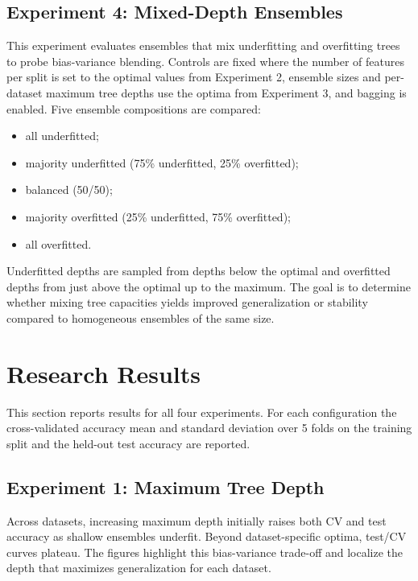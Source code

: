 \documentclass[conference]{IEEEtran}
\begin{document}
\subsection{Experiment 4: Mixed-Depth Ensembles}
This experiment evaluates ensembles that mix underfitting and overfitting trees to probe bias-variance blending. Controls are fixed where the number of features per split is set to the optimal values from Experiment 2, ensemble sizes and per-dataset maximum tree depths use the optima from Experiment 3, and bagging is enabled. 
Five ensemble compositions are compared:
\begin{itemize}
  \item all underfitted;
  \item majority underfitted (75\% underfitted, 25\% overfitted);
  \item balanced (50/50);
  \item majority overfitted (25\% underfitted, 75\% overfitted);
  \item all overfitted. 
\end{itemize}
Underfitted depths are sampled from depths below the optimal and overfitted depths from just above the optimal up to the maximum. The goal is to determine whether mixing tree capacities yields improved generalization or stability compared to homogeneous ensembles of the same size.



\section{Research Results}

\label{sec:results}

This section reports results for all four experiments. For each configuration the cross-validated accuracy mean and standard deviation over 5 folds on the training split and the held-out test accuracy are reported. 



\subsection{Experiment 1: Maximum Tree Depth}
\label{sec:results-exp1}

Across datasets, increasing maximum depth initially raises both CV and test accuracy as shallow ensembles underfit. Beyond dataset-specific optima, test/CV curves plateau. The figures highlight this bias-variance trade-off and localize the depth that maximizes generalization for each dataset.
\end{document}
